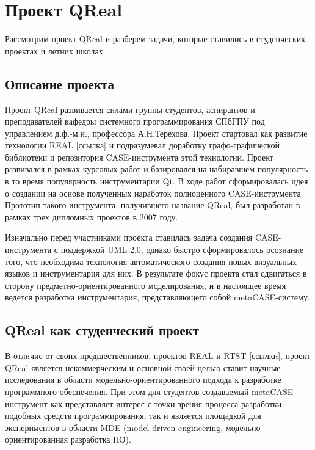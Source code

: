 \documentclass[a5paper]{article}
\begin{document}
\section{Проект QReal}

Рассмотрим проект QReal и разберем задачи, которые ставились в студенческих проектах и летних школах.

\subsection{Описание проекта}

Проект QReal развивается силами группы студентов, аспирантов и преподавателей кафедры системного программирования СПбГПУ под управлением д.ф.-м.н., профессора А.Н.Терехова. Проект стартовал как развитие технологии REAL [ссылка] и подразумевал доработку графо-графической библиотеки и репозитория CASE-инструмента этой технологии. Проект развивался в рамках курсовых работ и базировался на набиравшем популярность в то время популярность инструментарии Qt. В ходе работ сформировалась идея о создании на основе полученных наработок полноценного CASE-инструмента. Прототип такого инструмента, получившего название QReal, был разработан в рамках трех дипломных проектов в 2007 году. 

Изначально перед участниками проекта ставилась задача создания CASE-инструмента с поддержкой UML 2.0, однако быстро сформировалось осознание того, что необходима технология автоматического создания новых визуальных языков и инструментария для них. В результате фокус проекта стал сдвигаться в сторону предметно-ориентированного моделирования, и в настоящее время ведется разработка инструментария, представляющего собой metaCASE-систему. 

\subsection{QReal как студенческий проект}

В отличие от своих предшественников, проектов REAL и RTST [ссылки], проект QReal является некоммерческим и основной своей целью ставит научные исследования в области модельно-ориентированного подхода к разработке программного обеспечения. При этом для студентов создаваемый metaCASE-инструмент как представляет интерес с точки зрения процесса разработки подобных средств программирования, так и является площадкой для экспериментов в области MDE (model-driven engineering, модельно-ориентированная разработка ПО). 
\end{document}
